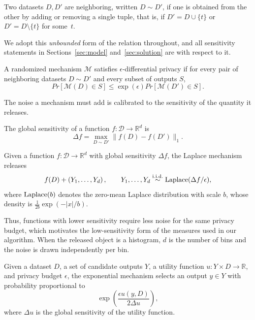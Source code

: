 \begin{definition}
\label{def:neighboring}
Two datasets $D,D'$ are neighboring, written $D\sim D'$, if one is obtained
from the other by adding or removing a single tuple, that is, if
$D'=D\cup\{t\}$ or $D'=D\setminus\{t\}$ for some~$t$.
\end{definition}

We adopt this \emph{unbounded} form of the relation throughout, and all sensitivity
statements in Sections~\ref{sec:model} and~\ref{sec:solution} are with respect to
it.

\begin{definition}
A randomized mechanism $\mathcal{M}$ satisfies $\epsilon$-differential privacy if for
every pair of neighboring datasets $D\sim D'$ and every subset of outputs $S$,
\[
Pr[\mathcal{M}(D)\in S]
\leq
\exp(\epsilon)
Pr[\mathcal{M}(D')\in S].
\]
\end{definition}

The noise a mechanism must add is calibrated to the sensitivity of the quantity it
releases.

\begin{definition}
\label{def:global-sensitivity}
The global sensitivity of a function $f:\mathcal{D}\rightarrow\mathbb{R}^d$ is
\[
\Delta f
=
\max_{D\sim D'}
\|f(D)-f(D')\|_1 .
\]
\end{definition}

\begin{definition}
\label{def:laplace-mechanism}
Given a function $f:\mathcal{D}\rightarrow\mathbb{R}^d$ with global sensitivity
$\Delta f$, the Laplace mechanism releases
\[
f(D)+\left(Y_1,\ldots,Y_d\right),
\qquad
Y_1,\ldots,Y_d \stackrel{\text{i.i.d.}}{\sim} \operatorname{Laplace}(\Delta f/\epsilon),
\]
where $\operatorname{Laplace}(b)$ denotes the zero-mean Laplace distribution with scale $b$, whose
density is $\frac{1}{2b}\exp(-|x|/b)$.
\end{definition}

Thus, functions with lower sensitivity require less noise for the same
privacy budget, which motivates the low-sensitivity form of the measures used in
our algorithm.
When the released object is a histogram, $d$ is the number of bins and the noise is
drawn independently per bin.

\begin{definition}
\label{def:exponential-mechanism}
Given a dataset $D$, a set of candidate outputs $Y$, a utility function
$u:Y\times D\rightarrow\mathbb{R}$, and privacy budget $\epsilon$, the exponential
mechanism selects an output $y\in Y$ with probability proportional to
\[
\exp\left(
\frac{\epsilon u(y,D)}
{2\Delta u}
\right),
\]
where $\Delta u$ is the global sensitivity of the utility function.
\end{definition}

